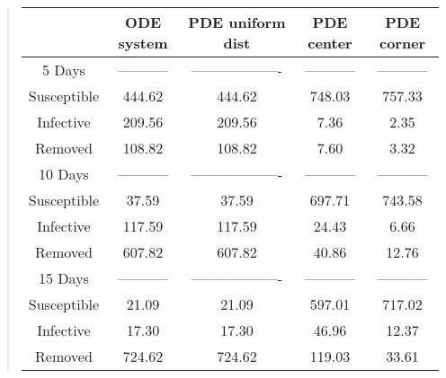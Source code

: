 \documentclass[%
twoside,                 %
final,                   %
chapterprefix=true,      %
open=right               %
10pt]{book}
\begin{document}
\label{table:british_number_table}

\begin{quote}
\begin{tabular}{ccccc}
\hline
\multicolumn{1}{c}{  } & \multicolumn{1}{c}{ ODE system } & \multicolumn{1}{c}{ PDE uniform dist } & \multicolumn{1}{c}{ PDE center } & \multicolumn{1}{c}{ PDE corner } \\
\hline
5 Days              & -----------         & ------------------- & -----------         & -----------         \\
\hline
Susceptible         & 444.62              & 444.62              & 748.03              & 757.33              \\
Infective           & 209.56              & 209.56              & 7.36                & 2.35                \\
Removed             & 108.82              & 108.82              & 7.60                & 3.32                \\
\hline
10 Days             & -----------         & ------------------- & -----------         & -----------         \\
\hline
Susceptible         & 37.59               & 37.59               & 697.71              & 743.58              \\
Infective           & 117.59              & 117.59              & 24.43               & 6.66                \\
Removed             & 607.82              & 607.82              & 40.86               & 12.76               \\
\hline
15 Days             & -----------         & ------------------- & -----------         & -----------         \\
\hline
Susceptible         & 21.09               & 21.09               & 597.01              & 717.02              \\
Infective           & 17.30               & 17.30               & 46.96               & 12.37               \\
Removed             & 724.62              & 724.62              & 119.03              & 33.61               \\
\hline
\end{tabular}
\end{quote}

\noindent
\end{document}
